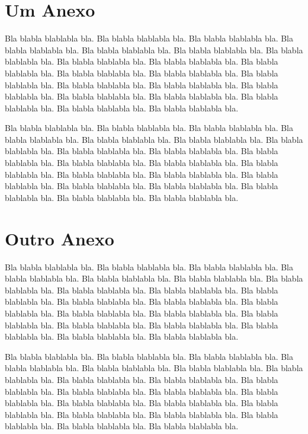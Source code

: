 \documentclass[tcc,ec]{texfurg} %
\begin{document}



\annex
\chapter{Um Anexo}

  Bla blabla blablabla bla.  Bla blabla blablabla bla.  Bla blabla blablabla
  bla.  Bla blabla blablabla bla.  Bla blabla blablabla bla.  Bla blabla
  blablabla bla.  Bla blabla blablabla bla.  Bla blabla blablabla bla.  Bla
  blabla blablabla bla.  Bla blabla blablabla bla.  Bla blabla blablabla bla.
  Bla blabla blablabla bla.  Bla blabla blablabla bla.  Bla blabla blablabla
  bla.  Bla blabla blablabla bla.  Bla blabla blablabla bla.  Bla blabla
  blablabla bla.  Bla blabla blablabla bla.  Bla blabla blablabla bla.  Bla
  blabla blablabla bla.  Bla blabla blablabla bla.

  Bla blabla blablabla bla.  Bla blabla blablabla bla.  Bla blabla blablabla
  bla.  Bla blabla blablabla bla.  Bla blabla blablabla bla.  Bla blabla
  blablabla bla.  Bla blabla blablabla bla.  Bla blabla blablabla bla.  Bla
  blabla blablabla bla.  Bla blabla blablabla bla.  Bla blabla blablabla bla.
  Bla blabla blablabla bla.  Bla blabla blablabla bla.  Bla blabla blablabla
  bla.  Bla blabla blablabla bla.  Bla blabla blablabla bla.  Bla blabla
  blablabla bla.  Bla blabla blablabla bla.  Bla blabla blablabla bla.  Bla
  blabla blablabla bla.  Bla blabla blablabla bla.

\chapter{Outro Anexo}

  Bla blabla blablabla bla.  Bla blabla blablabla bla.  Bla blabla blablabla
  bla.  Bla blabla blablabla bla.  Bla blabla blablabla bla.  Bla blabla
  blablabla bla.  Bla blabla blablabla bla.  Bla blabla blablabla bla.  Bla
  blabla blablabla bla.  Bla blabla blablabla bla.  Bla blabla blablabla bla.
  Bla blabla blablabla bla.  Bla blabla blablabla bla.  Bla blabla blablabla
  bla.  Bla blabla blablabla bla.  Bla blabla blablabla bla.  Bla blabla
  blablabla bla.  Bla blabla blablabla bla.  Bla blabla blablabla bla.  Bla
  blabla blablabla bla.  Bla blabla blablabla bla.

  Bla blabla blablabla bla.  Bla blabla blablabla bla.  Bla blabla blablabla
  bla.  Bla blabla blablabla bla.  Bla blabla blablabla bla.  Bla blabla
  blablabla bla.  Bla blabla blablabla bla.  Bla blabla blablabla bla.  Bla
  blabla blablabla bla.  Bla blabla blablabla bla.  Bla blabla blablabla bla.
  Bla blabla blablabla bla.  Bla blabla blablabla bla.  Bla blabla blablabla
  bla.  Bla blabla blablabla bla.  Bla blabla blablabla bla.  Bla blabla
  blablabla bla.  Bla blabla blablabla bla.  Bla blabla blablabla bla.  Bla
  blabla blablabla bla.  Bla blabla blablabla bla.
\end{document}

